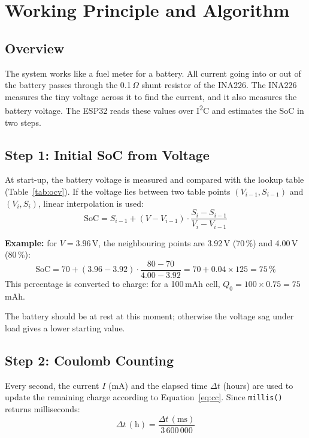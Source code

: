 \documentclass[12pt,a4paper,oneside]{report}
\begin{document}
\chapter{Working Principle and Algorithm}\label{ch:principle}

\section{Overview}
The system works like a fuel meter for a battery. All current going into or out of the battery passes through the 0.1\,$\Omega$ shunt resistor of the INA226. The INA226 measures the tiny voltage across it to find the current, and it also measures the battery voltage. The ESP32 reads these values over I\textsuperscript{2}C and estimates the SoC in two steps.

\section{Step 1: Initial SoC from Voltage}
At start-up, the battery voltage is measured and compared with the lookup table (Table~\ref{tab:ocv}). If the voltage lies between two table points $(V_{i-1}, S_{i-1})$ and $(V_i, S_i)$, linear interpolation is used:
\begin{equation}
  \text{SoC} = S_{i-1} + (V - V_{i-1}) \cdot \frac{S_i - S_{i-1}}{V_i - V_{i-1}}
\end{equation}

\textbf{Example:} for $V = 3.96$\,V, the neighbouring points are 3.92\,V (70\,\%) and 4.00\,V (80\,\%):
\[
\text{SoC} = 70 + (3.96 - 3.92)\cdot\frac{80-70}{4.00-3.92} = 70 + 0.04 \times 125 = 75\,\%
\]
This percentage is converted to charge: for a 100\,mAh cell, $Q_0 = 100 \times 0.75 = 75$\,mAh.

The battery should be at rest at this moment; otherwise the voltage sag under load gives a lower starting value.

\section{Step 2: Coulomb Counting}
Every second, the current $I$ (mA) and the elapsed time $\Delta t$ (hours) are used to update the remaining charge according to Equation~\eqref{eq:cc}. Since \texttt{millis()} returns milliseconds:
\begin{equation}
  \Delta t\,(\text{h}) = \frac{\Delta t\,(\text{ms})}{3\,600\,000}
\end{equation}
\end{document}
